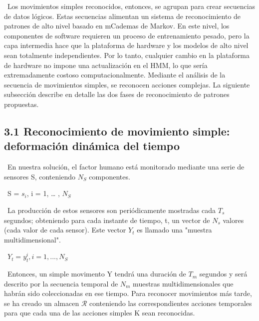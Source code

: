 \documentclass{paper}
\begin{document}
\ Los movimientos simples reconocidos, entonces, se agrupan para crear secuencias de datos lógicos. Estas secuencias alimentan un sistema de reconocimiento de patrones de alto nivel basado en mCademas de Markov. En este nivel, los componentes de software requieren un proceso de entrenamiento pesado, pero la capa intermedia hace que la plataforma de hardware y los modelos de alto nivel sean totalmente independientes. Por lo tanto, cualquier cambio en la plataforma de hardware no impone una actualización en el HMM, lo que sería extremadamente costoso computacionalmente. Mediante el análisis de la secuencia de movimientos simples, se reconocen acciones complejas. La siguiente subsección describe en detalle las dos fases de reconocimiento de patrones propuestas.



\subsection*{ 3.1 Reconocimiento de movimiento simple: deformación dinámica del tiempo}



\ En nuestra solución, el factor humano está monitorado mediante una serie de sensores S, conteniendo $N_S$  componentes.

\ S = { $s_i$, i = 1, … , $N_S$ }

\ La producción de estos sensores son periódicamente mostradas cada $T_s$ segundos; obteniendo para cada instante de tiempo, t, un vector de $N_s$ valores (cada valor de cada sensor). Este vector $Y_t$ es llamado una "muestra multidimensional".

\ $Y_t = {y_t^i , i = 1, ..., N_S}$

\ Entonces, un simple movimento Y tendrá una duración de $T_m$ segundos y será descrito por la secuencia temporal de $N_m$ muestras multidimensionales que habrán sido coleccionadas en ese tiempo. Para reconocer movimientos más tarde, se ha creado un almacen $\mathcal{R}$ conteniendo las correspondientes acciones temporales para que cada una de las acciones simples K sean reconocidas.
\end{document}
